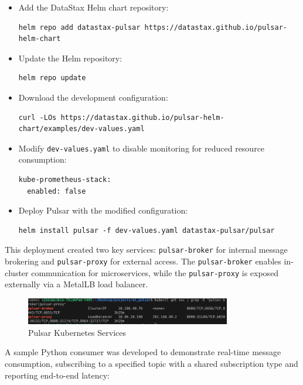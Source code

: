 \begin{itemize}
    \item Add the DataStax Helm chart repository:
    \begin{lstlisting}
helm repo add datastax-pulsar https://datastax.github.io/pulsar-helm-chart
    \end{lstlisting}
    \item Update the Helm repository:
    \begin{lstlisting}
helm repo update
    \end{lstlisting}
    \item Download the development configuration:
    \begin{lstlisting}
curl -LOs https://datastax.github.io/pulsar-helm-chart/examples/dev-values.yaml
    \end{lstlisting}
    \item Modify \texttt{dev-values.yaml} to disable monitoring for reduced resource consumption:
    \begin{lstlisting}
kube-prometheus-stack:
  enabled: false
    \end{lstlisting}
    \item Deploy Pulsar with the modified configuration:
    \begin{lstlisting}
helm install pulsar -f dev-values.yaml datastax-pulsar/pulsar
    \end{lstlisting}
\end{itemize}

This deployment created two key services: \texttt{pulsar-broker} for internal message brokering and \texttt{pulsar-proxy} for external access. The \texttt{pulsar-broker} enables in-cluster communication for microservices, while the \texttt{pulsar-proxy} is exposed externally via a MetalLB load balancer.

\begin{figure}[h!]
    \centering
    \includegraphics[width=0.8\textwidth]{implementation/pulsar-svcs.png}
    \caption{Pulsar Kubernetes Services}
    \label{fig:kgetpods}
\end{figure}

A sample Python consumer was developed to demonstrate real-time message consumption, subscribing to a specified topic with a shared subscription type and reporting end-to-end latency:

